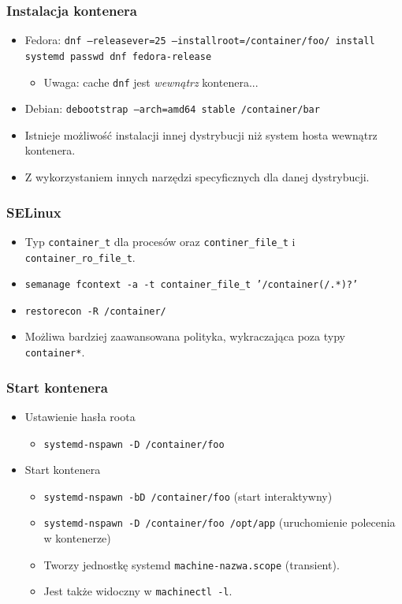 \documentclass[dvipsnames,table]{beamer}
\begin{document}
\begin{frame}
\frametitle{Instalacja kontenera}
\begin{itemize}
	\item Fedora: {\tt dnf --releasever=25 --installroot=/container/foo/ install systemd passwd dnf fedora-release}
	\begin{itemize}
		\item Uwaga: cache {\tt dnf} jest {\it wewnątrz} kontenera... 
	\end{itemize}
	\item Debian: {\tt debootstrap --arch=amd64 stable /container/bar}
	\item Istnieje możliwość instalacji innej dystrybucji niż system hosta wewnątrz kontenera.
	\item Z wykorzystaniem innych narzędzi specyficznych dla danej dystrybucji.
\end{itemize}
\end{frame}

\begin{frame}
\frametitle{SELinux}
\begin{itemize}
	\item Typ {\tt container\_t} dla procesów oraz {\tt continer\_file\_t} i {\tt container\_ro\_file\_t}.
	\item {\tt semanage fcontext -a -t container\_file\_t '/container(/.*)?'}
	\item {\tt restorecon -R /container/}
	\item Możliwa bardziej zaawansowana polityka, wykraczająca poza typy {\tt container*}.
\end{itemize}	
\end{frame}

\begin{frame}
\frametitle{Start kontenera}
\begin{itemize}
	\item Ustawienie hasła roota
	\begin{itemize}
		\item {\tt systemd-nspawn -D /container/foo}
	\end{itemize}
	\item Start kontenera
	\begin{itemize}
		\item {\tt systemd-nspawn -bD /container/foo} (start interaktywny)
		\item {\tt systemd-nspawn -D /container/foo /opt/app} (uruchomienie polecenia w kontenerze)
		\item Tworzy jednostkę systemd {\tt machine-nazwa.scope} (transient).
		\item Jest także widoczny w {\tt machinectl -l}.
	\end{itemize}	
\end{itemize}
\end{frame}
\end{document}

